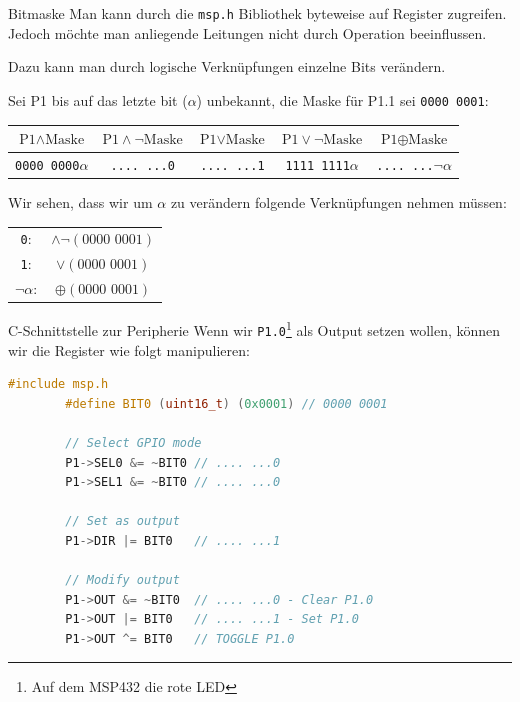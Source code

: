 \begin{bonus}{Bitmaske}
    Man kann durch die \texttt{msp.h} Bibliothek byteweise auf Register zugreifen.
    Jedoch möchte man anliegende Leitungen nicht durch Operation beeinflussen.

    Dazu kann man durch logische Verknüpfungen einzelne Bits verändern.

    Sei P1 bis auf das letzte bit (\texttt{$\alpha$}) unbekannt, die Maske für P1.1 sei \texttt{0000 0001}:

    \begin{center}
        \begin{tabular}{|c|c|c|c|c|}
            \hline
            $\text{P1} \land \text{Maske}$ & $\text{P1} \land \lnot \text{Maske}$ & $\text{P1} \lor \text{Maske}$ & $\text{P1} \lor \lnot \text{Maske}$ & $\text{P1} \oplus \text{Maske}$ \\\hline\hline
            \texttt{0000 0000$\alpha$}     & \texttt{.... ...0}                   & \texttt{.... ...1}            & \texttt{1111 1111$\alpha$}          & \texttt{.... ...$\lnot \alpha$} \\\hline
        \end{tabular}
    \end{center}

    Wir sehen, dass wir um $\alpha$ zu verändern folgende Verknüpfungen nehmen müssen:

    \begin{tabular}{cc}
        \texttt{0}:              & $\land \lnot (\text{0000 0001})$ \\
        \texttt{1}:              & $\lor (\text{0000 0001})$        \\
        \texttt{$\lnot \alpha$}: & $\oplus (\text{0000 0001})$      \\
    \end{tabular}
\end{bonus}

\begin{example}{C-Schnittstelle zur Peripherie}
    Wenn wir \texttt{P1.0}\footnote{Auf dem MSP432 die rote LED} als Output setzen wollen, können wir die Register wie folgt manipulieren:

    \begin{lstlisting}[language=c]
        #include msp.h
        #define BIT0 (uint16_t) (0x0001) // 0000 0001

        // Select GPIO mode
        P1->SEL0 &= ~BIT0 // .... ...0
        P1->SEL1 &= ~BIT0 // .... ...0

        // Set as output
        P1->DIR |= BIT0   // .... ...1

        // Modify output
        P1->OUT &= ~BIT0  // .... ...0 - Clear P1.0
        P1->OUT |= BIT0   // .... ...1 - Set P1.0
        P1->OUT ^= BIT0   // TOGGLE P1.0
    \end{lstlisting}
\end{example}

